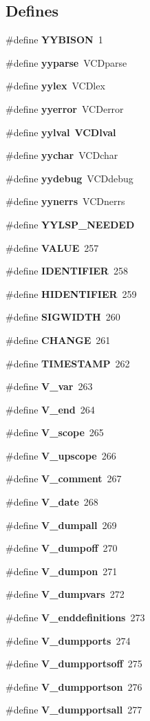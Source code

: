 \subsection*{Defines}
\begin{CompactItemize}
\item 
\#define {\bf YYBISON}\ 1
\item 
\#define {\bf yyparse}\ VCDparse
\item 
\#define {\bf yylex}\ VCDlex
\item 
\#define {\bf yyerror}\ VCDerror
\item 
\#define {\bf yylval}\ {\bf VCDlval}
\item 
\#define {\bf yychar}\ VCDchar
\item 
\#define {\bf yydebug}\ VCDdebug
\item 
\#define {\bf yynerrs}\ VCDnerrs
\item 
\#define {\bf YYLSP\_\-NEEDED}
\item 
\#define {\bf VALUE}\ 257
\item 
\#define {\bf IDENTIFIER}\ 258
\item 
\#define {\bf HIDENTIFIER}\ 259
\item 
\#define {\bf SIGWIDTH}\ 260
\item 
\#define {\bf CHANGE}\ 261
\item 
\#define {\bf TIMESTAMP}\ 262
\item 
\#define {\bf V\_\-var}\ 263
\item 
\#define {\bf V\_\-end}\ 264
\item 
\#define {\bf V\_\-scope}\ 265
\item 
\#define {\bf V\_\-upscope}\ 266
\item 
\#define {\bf V\_\-comment}\ 267
\item 
\#define {\bf V\_\-date}\ 268
\item 
\#define {\bf V\_\-dumpall}\ 269
\item 
\#define {\bf V\_\-dumpoff}\ 270
\item 
\#define {\bf V\_\-dumpon}\ 271
\item 
\#define {\bf V\_\-dumpvars}\ 272
\item 
\#define {\bf V\_\-enddefinitions}\ 273
\item 
\#define {\bf V\_\-dumpports}\ 274
\item 
\#define {\bf V\_\-dumpportsoff}\ 275
\item 
\#define {\bf V\_\-dumpportson}\ 276
\item 
\#define {\bf V\_\-dumpportsall}\ 277

\end{CompactItemize}
